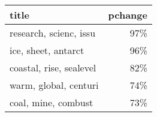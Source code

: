 \begin{tabular}{p{1.2cm}r}
\toprule
                   title &  pchange \\
\midrule
  research, scienc, issu &      97\% \\
     ice, sheet, antarct &      96\% \\
 coastal, rise, sealevel &      82\% \\
   warm, global, centuri &      74\% \\
     coal, mine, combust &      73\% \\
\bottomrule
\end{tabular}
